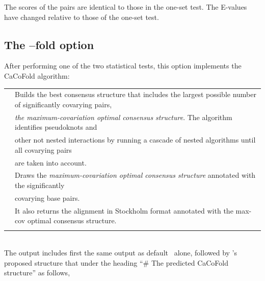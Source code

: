 The scores of the pairs are identical to those in the one-set
test. The E-values have changed relative to those of the one-set test.


\subsection{The --fold option}

After performing one of the two statistical tests, this option implements the CaCoFold algorithm:\\

\begin{tabular}{ll}
\textbf{}   & Builds the best consensus structure that includes the largest possible number of significantly covarying pairs,\\
\textbf{}   & \hspace{5mm}\emph{the maximum-covariation optimal consensus structure}. The algorithm identifies pseudoknots and\\
\textbf{}   & \hspace{5mm}other not nested interactions by running a cascade of nested algorithms until all covarying pairs\\
\textbf{}   & \hspace{5mm}are taken into account.\\
\textbf{}   & Draws the \emph{maximum-covariation optimal consensus structure} annotated with the significantly \\
\textbf{}   & \hspace{5mm}covarying base pairs.\\
\textbf{}   & It also returns the alignment in Stockholm format annotated with the max-cov optimal consensus structure.\\
 & \\ 
\end{tabular}

\\

\noindent
The output includes first the same output as default \rscape\ alone,
followed by \rscape's proposed structure that under the heading ``\#
The predicted CaCoFold structure'' as follows,

